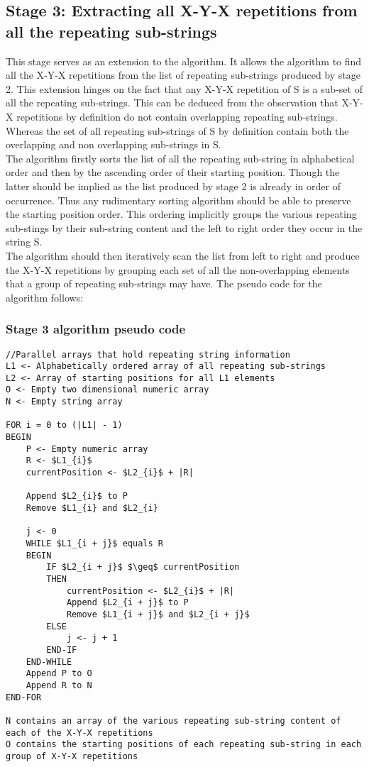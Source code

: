 \documentclass[12pt]{article}
\begin{document}
\begin{flushleft}
	\subsection{Stage 3: Extracting all X-Y-X repetitions from all the repeating sub-strings}
	This stage serves as an extension to the algorithm. It allows the algorithm to find all the X-Y-X repetitions from the list of repeating sub-strings produced by stage 2. This extension hinges on the fact that any X-Y-X repetition of S is a sub-set of all the repeating sub-strings. This can be deduced from the observation that X-Y-X repetitions by definition do not contain overlapping repeating sub-strings. Whereas the set of all repeating sub-strings of S by definition contain both the overlapping and non overlapping sub-strings in S.\\
	The algorithm firstly sorts the list of all the repeating sub-string in alphabetical order and then by the ascending order of their starting position. Though the latter should be implied as the list produced by stage 2 is already in order of occurrence. Thus any rudimentary sorting algorithm should be able to preserve the starting position order. This ordering implicitly groups the various repeating sub-stings by their sub-string content and the left to right order they occur in the string S.\\
	The algorithm should then iteratively scan the list from left to right and produce the X-Y-X repetitions by grouping each set of all the non-overlapping elements that a group of repeating sub-strings may have. The pseudo code for the algorithm follows:
	\newpage
	\subsubsection{Stage 3 algorithm pseudo code}
	
\begin{lstlisting}
//Parallel arrays that hold repeating string information
L1 <- Alphabetically ordered array of all repeating sub-strings 
L2 <- Array of starting positions for all L1 elements
O <- Empty two dimensional numeric array
N <- Empty string array

FOR i = 0 to (|L1| - 1)
BEGIN
	P <- Empty numeric array
	R <- $L1_{i}$
	currentPosition <- $L2_{i}$ + |R|
	
	Append $L2_{i}$ to P	
	Remove $L1_{i} and $L2_{i}	
	
	j <- 0		
	WHILE $L1_{i + j}$ equals R
	BEGIN
		IF $L2_{i + j}$ $\geq$ currentPosition
		THEN 
			currentPosition <- $L2_{i}$ + |R|
			Append $L2_{i + j}$ to P
			Remove $L1_{i + j}$ and $L2_{i + j}$			
		ELSE
			j <- j + 1
		END-IF		
	END-WHILE
	Append P to O
	Append R to N  
END-FOR

N contains an array of the various repeating sub-string content of each of the X-Y-X repetitions
O contains the starting positions of each repeating sub-string in each group of X-Y-X repetitions 
\end{lstlisting} 
\end{flushleft}
\end{document}
